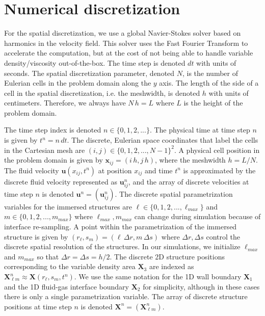 \documentclass{jfm}
\newcommand{\daniel}[1]{\todo[inline,color=yellow!40]{Daniel: #1}}
\newcommand{\michael}[1]{\todo[inline,color=red!40]{Michael: #1}}
\begin{document}
\section {Numerical discretization\label{sec:discretization}}

For the spatial discretization, we use a global Navier-Stokes solver based on harmonics in the velocity field. This solver uses the Fast Fourier Transform to accelerate the computation, but at the cost of not being able to handle variable density/viscosity out-of-the-box. The time step is denoted $dt$ with units of seconds. The spatial discretization parameter, denoted $N$, is the number of Eulerian cells in the problem domain along the $y$ axis. The length of the side of a cell in the spatial discretization, i.e. the meshwidth, is denoted $h$ with units of centimeters. Therefore, we always have $N \, h = L$ where $L$ is the height of the problem domain. 

The time step index is denoted $n \in \{0, 1, 2, ...\}$. The physical time at time step $n$ is given by $t^n = n \, dt$. The discrete, Eulerian space coordinates that label the cells in the Cartesian mesh are $(i, j) \in \{0, 1, 2, ..., N-1\}^2$. A physical cell position in the problem domain is given by ${\bm x}_{ij} = (i \, h, j \, h)$,
where the meshwidth $h = L / N$. The fluid velocity  $\boldsymbol{u}(x_{ij},t^n)$ at position $x_{ij}$ and time $t^n$ is approximated by the discrete fluid velocity represented as $\bm{u}_{ij}^n$, and the array of discrete velocities at time step $n$ is denoted ${\bm u}^n = (\bm{u}_{ij}^n)$. %
The discrete spatial parametrization variables for the immersed structures are $\ell \in \{0, 1, 2, ..., \ell_{max}\}$ and $m \in \{0, 1, 2, ..., m_{max}\}$ where $\ell_{max}, m_{max}$ can change during simulation because of interface re-sampling. A point within the parametrization of the immersed structure is given by $(r_\ell, s_m) = (\ell \, \Delta r, m \, \Delta s)$ where $\Delta r, \Delta s$ control the discrete spatial resolution of the structures. In our simulations, we initialize $\ell_{max}$ and $m_{max}$ so that $\Delta r = \Delta s = h / 2$. The discrete 2D structure positions corresponding to the variable density area $\bm{X}_3$ are indexed as  $\bm{X}_{\ell m}^n \approx \bm{X}(r_\ell,s_m,t^n)$. We use the same notation for the 1D wall boundary $\bm{X}_1$ and the 1D fluid-gas interface boundary $\bm{X}_2$ for simplicity, although in these cases there is only a single parametrization variable. The array of discrete structure positions at time step $n$ is denoted $\bm{X}^n = (\bm{X}_{\ell m}^n)$.
\end{document}
